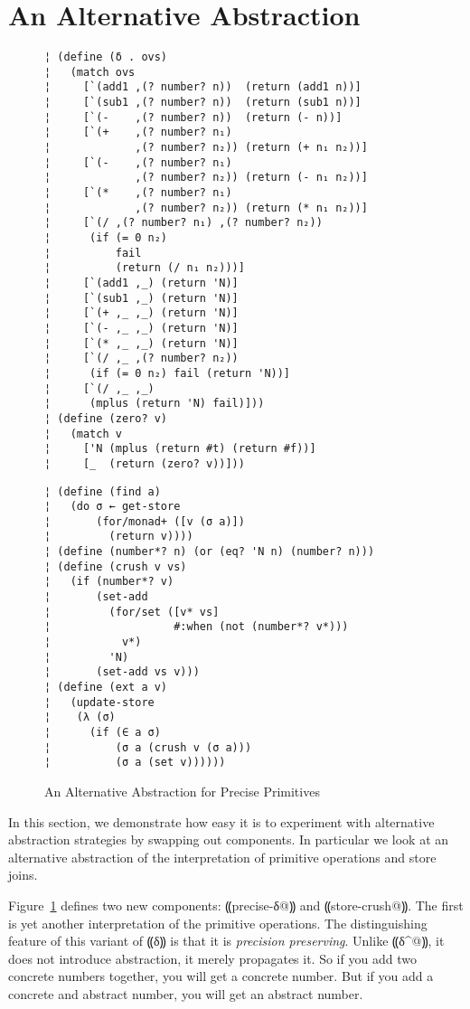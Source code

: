 \section{An Alternative Abstraction}\label{s:alt-abstraction}

\begin{figure}
\begin{lstlisting}
¦ (define (δ . ovs)
¦   (match ovs
¦     [`(add1 ,(? number? n))  (return (add1 n))]
¦     [`(sub1 ,(? number? n))  (return (sub1 n))]
¦     [`(-    ,(? number? n))  (return (- n))]
¦     [`(+    ,(? number? n₁)
¦             ,(? number? n₂)) (return (+ n₁ n₂))]
¦     [`(-    ,(? number? n₁)
¦             ,(? number? n₂)) (return (- n₁ n₂))]
¦     [`(*    ,(? number? n₁)
¦             ,(? number? n₂)) (return (* n₁ n₂))]
¦     [`(/ ,(? number? n₁) ,(? number? n₂))
¦      (if (= 0 n₂)
¦          fail
¦          (return (/ n₁ n₂)))]
¦     [`(add1 ,_) (return 'N)]
¦     [`(sub1 ,_) (return 'N)]
¦     [`(+ ,_ ,_) (return 'N)]
¦     [`(- ,_ ,_) (return 'N)]
¦     [`(* ,_ ,_) (return 'N)]
¦     [`(/ ,_ ,(? number? n₂))
¦      (if (= 0 n₂) fail (return 'N))]
¦     [`(/ ,_ ,_)
¦      (mplus (return 'N) fail)]))
¦ (define (zero? v)
¦   (match v
¦     ['N (mplus (return #t) (return #f))]
¦     [_  (return (zero? v))]))
\end{lstlisting}
\figskip{}
\begin{lstlisting}
¦ (define (find a)
¦   (do σ ← get-store
¦       (for/monad+ ([v (σ a)])
¦         (return v))))
¦ (define (number*? n) (or (eq? 'N n) (number? n)))
¦ (define (crush v vs)
¦   (if (number*? v)
¦       (set-add 
¦         (for/set ([v* vs] 
¦                   #:when (not (number*? v*))) 
¦           v*) 
¦         'N)
¦       (set-add vs v)))
¦ (define (ext a v)
¦   (update-store
¦    (λ (σ)
¦      (if (∈ a σ)
¦          (σ a (crush v (σ a)))
¦          (σ a (set v))))))
\end{lstlisting}
\caption{An Alternative Abstraction for Precise Primitives}
\label{f:pres-delta}
\end{figure}

In this section, we demonstrate how easy it is to experiment with
alternative abstraction strategies by swapping out components.  In
particular we look at an alternative abstraction of the interpretation
of primitive operations and store joins.

Figure~\ref{f:pres-delta} defines two new components:
⸨precise-δ@⸩ and ⸨store-crush@⸩.  The first is yet
another interpretation of the primitive operations.  The
distinguishing feature of this variant of ⸨δ⸩ is that it is
\emph{precision preserving}.  Unlike ⸨δ^@⸩, it does not
introduce abstraction, it merely propagates it.  So if you add two
concrete numbers together, you will get a concrete number.  But if you
add a concrete and abstract number, you will get an abstract number.

